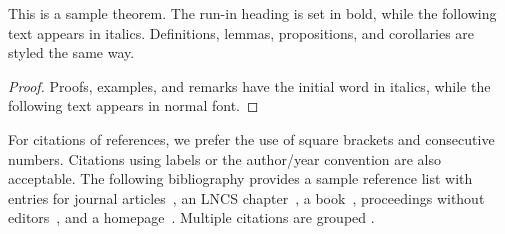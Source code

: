 \documentclass[runningheads]{llncs}
\begin{document}
\begin{theorem}
This is a sample theorem. The run-in heading is set in bold, while
the following text appears in italics. Definitions, lemmas,
propositions, and corollaries are styled the same way.
\end{theorem}
%
%
\begin{proof}
Proofs, examples, and remarks have the initial word in italics,
while the following text appears in normal font.
\end{proof}
For citations of references, we prefer the use of square brackets
and consecutive numbers. Citations using labels or the author/year
convention are also acceptable. The following bibliography provides
a sample reference list with entries for journal
articles~\cite{gonzalez-beltran_data_2018}, an LNCS chapter~\cite{gregory_todd_williams_sparql_2013}, a
book~\cite{ref_book1}, proceedings without editors~\cite{knublauch_shapes_2017},
and a homepage~\cite{knublauch_shapes_2017}. Multiple citations are grouped
\cite{gonzalez-beltran_data_2018,gregory_todd_williams_sparql_2013,knublauch_shapes_2017}.
%
%
%


%




\end{document}
